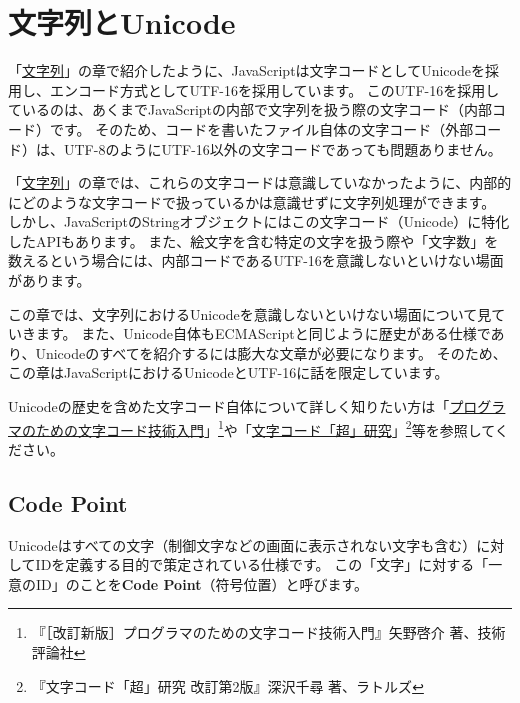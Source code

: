 \hypertarget{string-unicode}{%
\chapter{文字列とUnicode}\label{string-unicode}}
\thispagestyle{frontheadings}

「\hyperlink{string}{文字列}」の章で紹介したように、JavaScriptは文字コードとしてUnicodeを採用し、エンコード方式としてUTF-16を採用しています。
このUTF-16を採用しているのは、あくまでJavaScriptの内部で文字列を扱う際の文字コード（内部コード）です。
そのため、コードを書いたファイル自体の文字コード（外部コード）は、UTF-8のようにUTF-16以外の文字コードであっても問題ありません。

「\hyperlink{string}{文字列}」の章では、これらの文字コードは意識していなかったように、内部的にどのような文字コードで扱っているかは意識せずに文字列処理ができます。
しかし、JavaScriptのStringオブジェクトにはこの文字コード（Unicode）に特化したAPIもあります。
また、絵文字を含む特定の文字を扱う際や「文字数」を数えるという場合には、内部コードであるUTF-16を意識しないといけない場面があります。

この章では、文字列におけるUnicodeを意識しないといけない場面について見ていきます。
また、Unicode自体もECMAScriptと同じように歴史がある仕様であり、Unicodeのすべてを紹介するには膨大な文章が必要になります。
そのため、この章はJavaScriptにおけるUnicodeとUTF-16に話を限定しています。

Unicodeの歴史を含めた文字コード自体について詳しく知りたい方は「\href{https://gihyo.jp/book/2019/978-4-297-10291-3}{プログラマのための文字コード技術入門}」\footnote{『［改訂新版］プログラマのための文字コード技術入門』矢野啓介 著、技術評論社}や「\href{https://www.rutles.net/products/detail.php?product_id=298}{文字コード「超」研究}」\footnote{『文字コード「超」研究 改訂第2版』深沢千尋 著、ラトルズ}等を参照してください。

\hypertarget{code-point}{%
\section{Code Point}\label{code-point}}

Unicodeはすべての文字（制御文字などの画面に表示されない文字も含む）に対してIDを定義する目的で策定されている仕様です。
この「文字」に対する「一意のID」のことを\textbf{Code
Point}（符号位置）と呼びます。

